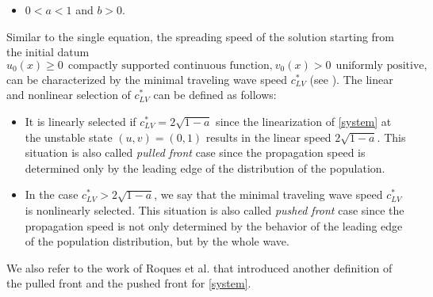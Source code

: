 \documentclass[11pt,a4paper]{article}
\numberwithin{equation}{section}
\numberwithin{figure}{section}
\begin{document}
\begin{itemize}
\item[{\bf(H)}] $0<a<1$ and $b>0$.
\end{itemize}





Similar to the single equation, the spreading speed of the solution starting from the initial datum 
\begin{equation}\label{initial datum}
u_0(x)\ge 0\ \ \text{compactly supported continuous function,}\ v_0(x)>0\ \ \text{uniformly positive},
\end{equation}
can be characterized by the minimal traveling wave speed $c_{LV}^{*}$ (see \cite{Lewis Li Weinberger 1}). 
The linear and nonlinear selection of $c_{LV}^{*}$ can be defined as follows:
\begin{itemize}
\item
It is linearly selected if
$c_{LV}^{*}=2\sqrt{1-a}$ since the linearization of  \eqref{system}
at the unstable state $(u,v)=(0,1)$ results in the linear speed $2\sqrt{1-a}$.
This situation is also called {\em pulled front} case since the propagation speed is determined only by the leading edge of the distribution of the population.
\item 
In the case $c_{LV}^{*}>2\sqrt{1-a}$, we say that the minimal traveling wave speed $c_{LV}^{*}$ is nonlinearly selected.
This situation is also called {\em pushed front} case since the propagation speed is not only determined by the behavior of the leading edge of the population distribution, but by the whole wave.
\end{itemize}
We also refer to the work of Roques et al. \cite{Roques et al 2015} that introduced another definition of the pulled front and the pushed front for \eqref{system}.


\end{document}
